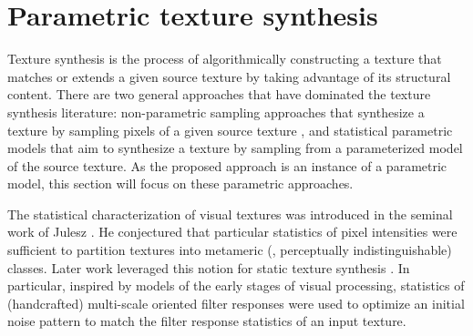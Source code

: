 \subsection{}



\section{Parametric texture synthesis}

Texture synthesis is the process of algorithmically constructing a texture that
matches or extends a given source texture by taking advantage of its structural 
content. There are two general approaches that have dominated the texture
synthesis literature: non-parametric sampling approaches that
synthesize a texture by sampling pixels of a given source texture
\cite{efros1999,kwatra2003graphcut,schodl2000,wei2000}, and 
statistical parametric models that aim to synthesize a texture by sampling
from a parameterized model of the source texture.
As the proposed approach is an instance of a parametric model, this section 
will focus on these parametric approaches.

The statistical characterization of visual textures was introduced
in the seminal work of Julesz \cite{julesz1962}.
He conjectured that particular statistics of pixel intensities
were sufficient to partition textures into metameric (\ie,
perceptually indistinguishable) classes. 
Later work leveraged this notion for static texture synthesis
\cite{heeger1995pyramid,portilla2000parametric}.
In particular, inspired by models of the early stages of visual 
processing, statistics of (handcrafted) multi-scale oriented filter 
responses were used to optimize an initial noise pattern 
to match the filter response statistics of an input texture.

